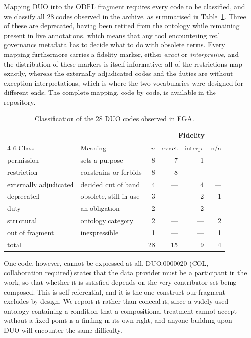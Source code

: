 \documentclass[sigconf,anonymous,review]{acmart}
\begin{document}
Mapping DUO into the ODRL fragment requires every code to be classified, and we
classify all 28 codes observed in the archive, as summarised in
Table~\ref{tab:duo}. Three of these are deprecated, having been retired from the
ontology while remaining present in live annotations, which means that any tool
encountering real governance metadata has to decide what to do with obsolete
terms. Every mapping furthermore carries a fidelity
marker, either \emph{exact} or \emph{interpretive}, and the distribution of
these markers is itself informative: all of the restrictions map exactly, whereas
the externally adjudicated codes and the duties are without exception
interpretations, which is where the two vocabularies were designed for different
ends. The complete mapping, code by code, is available in the repository.

\begin{table}[h]
\caption{Classification of the 28 DUO codes observed in EGA.}
\label{tab:duo}
\begin{tabular}{llrrrr}
\toprule
 & & & \multicolumn{3}{c}{Fidelity} \\
\cmidrule(l){4-6}
Class & Meaning & $n$ & exact & interp. & n/a \\
\midrule
permission & sets a purpose & 8 & 7 & 1 & --- \\
restriction & constrains or forbids & 8 & 8 & --- & --- \\
externally adjudicated & decided out of band & 4 & --- & 4 & --- \\
deprecated & obsolete, still in use & 3 & --- & 2 & 1 \\
duty & an obligation & 2 & --- & 2 & --- \\
structural & ontology category & 2 & --- & --- & 2 \\
out of fragment & inexpressible & 1 & --- & --- & 1 \\
\midrule
total & & 28 & 15 & 9 & 4 \\
\bottomrule
\end{tabular}
\end{table}

One code, however, cannot be expressed at all. DUO:0000020 (COL, collaboration
required) states that the data provider must be a participant in the work, so
that whether it is satisfied depends on the very contributor set being composed.
This is self-referential, and it is the one construct our fragment excludes by
design. We report it rather than conceal it, since a widely used ontology
containing a condition that a compositional treatment cannot accept without a
fixed point is a finding in its own right, and anyone building upon DUO will
encounter the same difficulty.
\end{document}
